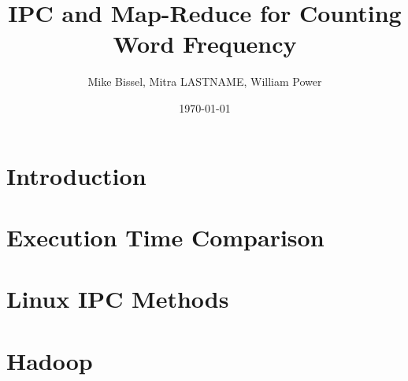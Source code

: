 \documentclass[12pt]{article}
\begin{document}
\title{IPC and Map-Reduce for Counting Word Frequency }
\author{Mike Bissel, Mitra LASTNAME, William Power}
\date{\today}
\maketitle

\section{Introduction}

\section{Execution Time Comparison}

\section{Linux IPC Methods}

\section{Hadoop}
\end{document}
